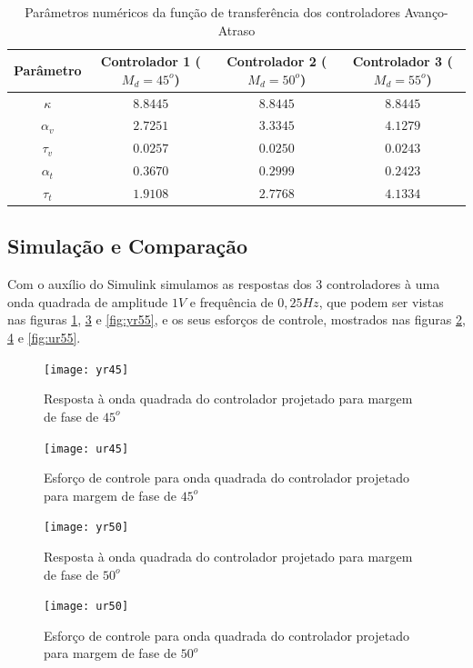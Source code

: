 \documentclass{article}
\begin{document}
\begin{table}[H]
	\centering
	\caption{Parâmetros numéricos da função de transferência dos controladores Avanço-Atraso}
	\label{tab:contr}
	\begin{tabular}{|c|c|c|c|}
		\hline Parâmetro & Controlador 1 ($M_d = 45^o$)& Controlador 2 ($M_d = 50^o$)& Controlador 3 ($M_d = 55^o$)\\ 
		\hline $\kappa$ & $8.8445$ & $8.8445$ & $8.8445$\\ 
		\hline $\alpha_v$ & $2.7251$ & $3.3345$ & $4.1279$\\ 
		\hline $\tau_v$ & $0.0257$ & $0.0250$ & $0.0243$\\ 
		\hline $\alpha_t$ & $0.3670$ & $0.2999$ & $0.2423$\\ 
		\hline $\tau_t$ & $1.9108$ & $2.7768$ & $4.1334$\\ 
		\hline 
	\end{tabular} 
\end{table}

\subsection{Simulação e Comparação}
Com o auxílio do Simulink simulamos as respostas dos 3 controladores à uma onda quadrada de amplitude $1V$ e frequência de $0,25Hz$, que podem ser vistas nas figuras \ref{fig:yr45}, \ref{fig:yr50} e \ref{fig:yr55}, e os seus esforços de controle, mostrados nas figuras \ref{fig:ur45}, \ref{fig:ur50} e \ref{fig:ur55}.
\begin{figure}[H]
	\centering
	\texttt{[image: yr45]}
	\caption{Resposta à onda quadrada do controlador projetado para margem de fase de $45^o$}
	\label{fig:yr45}
\end{figure}
\begin{figure}[H]
	\centering
	\texttt{[image: ur45]}
	\caption{Esforço de controle para onda quadrada do controlador projetado para margem de fase de $45^o$}
	\label{fig:ur45}
\end{figure}

\begin{figure}[H]
	\centering
	\texttt{[image: yr50]}
	\caption{Resposta à onda quadrada do controlador projetado para margem de fase de $50^o$}
	\label{fig:yr50}
\end{figure}
\begin{figure}[H]
	\centering
	\texttt{[image: ur50]}
	\caption{Esforço de controle para onda quadrada do controlador projetado para margem de fase de $50^o$}
	\label{fig:ur50}
\end{figure}
\end{document}
